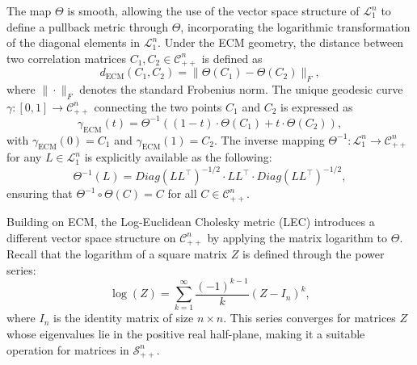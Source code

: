\documentclass[10pt]{article}
\newcommand{\SPD}{\mathcal{S}_{++}^n}
\newcommand{\CORR}{\mathcal{C}_{++}^n}
\newcommand{\LTones}{\mathcal{L}_1^n}
\newcommand{\rmECM}{\textrm{ECM}}
\begin{document}
The map $\Theta$ is smooth, allowing the use of the vector space structure of $\LTones$ to define a pullback metric through $\Theta$, incorporating the logarithmic transformation of the diagonal elements in $\LTones$. Under the ECM geometry, the distance between two correlation matrices $C_1, C_2 \in \CORR$ is defined as  
\begin{equation}\label{eq:defDistECM}
	d_{\rmECM}(C_1, C_2) = \| \Theta(C_1) - \Theta(C_2) \|_F,
\end{equation} where $\|\cdot \|_F$ denotes the standard Frobenius norm. The unique geodesic curve $\gamma:[0,1] \rightarrow \CORR$ connecting the two points $C_1$ and $C_2$ is expressed as \begin{equation*}
	\gamma_{\rmECM}(t) = \Theta^{-1} \left( (1-t) \cdot  \Theta(C_1) + t \cdot  \Theta(C_2) \right),
\end{equation*} with $\gamma_{\rmECM}(0) = C_1$ and $\gamma_{\rmECM}(1) = C_2$. The inverse mapping $\Theta^{-1}: \LTones \rightarrow \CORR$ for any $L \in \LTones$ is explicitly available as the following:
\begin{equation*}
	\Theta^{-1}(L) = Diag(LL^\top)^{-1/2} \cdot LL^\top \cdot Diag(LL^\top)^{-1/2},
\end{equation*}
ensuring that $\Theta^{-1} \circ \Theta(C) = C$ for all $C \in \CORR$.

Building on ECM, the Log-Euclidean Cholesky metric (LEC) introduces a different vector space structure on $\CORR$ by applying the matrix logarithm to $\Theta$. Recall that the logarithm of a square matrix $Z$ is defined through the power series:
\begin{equation*}
	\log(Z) = \sum_{k=1}^\infty \frac{(-1)^{k-1}}{k} (Z - I_n)^k,
\end{equation*}
where $I_n$ is the identity matrix of size $n \times n$. This series converges for matrices $Z$ whose eigenvalues lie in the positive real half-plane, making it a suitable operation for matrices in $\SPD$. 
\end{document}
